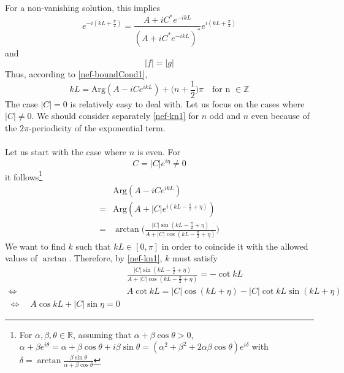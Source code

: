 For a non-vanishing solution, this implies
\begin{equation}\label{nef-boundCond1}
e^{-i(kL + \frac{\pi}{2})} = \frac{A + iC^* e^{-ikL}}{(A + iC^* e^{-ikL})^*} e^{i(kL + \frac{\pi}{2})}
\end{equation}
and 
\begin{equation}\label{nef-boundCond2}
| f | = | g |
\end{equation}
Thus, according to \cref{nef-boundCond1},
\begin{equation}\label{nef-kn1}
kL =  \textrm{Arg}(A - iC e^{ikL}) + \big(n+\frac{1}{2} \big)\pi   \quad \textrm{for n $\in \mathbb{Z}$}
\end{equation}
The case $|C| =0$ is relatively easy to deal with. Let us focus on the cases where $|C| \neq 0$. We should consider separately \cref{nef-kn1} for $n$ odd and $n$ even because of the $2\pi$-periodicity of the exponential term. \\\\
Let us start with the case where $n$ is even. 
For 
\begin{equation*}
C = |C| e^{i\eta} \neq 0 
\end{equation*}
it follows\footnote{
For $\alpha, \beta, \theta \in \mathbb{R}$, assuming that $\alpha + \beta \cos \theta > 0$, $\alpha + \beta e^{i \theta} = \alpha + \beta \cos \theta + i\beta \sin \theta = (\alpha^2 + \beta^2 + 2\alpha \beta \cos \theta) e^{i \delta}$ with $\delta = \arctan \frac{\beta\sin\theta}{\alpha + \beta\cos\theta}$  
} 
\begin{equation}
\begin{split}
&\textrm{Arg}(A - iC e^{ikL}) \\
= &\textrm{Arg}(A + |C| e^{i(kL - \frac{\pi}{2} + \eta)}) \\
= & \arctan \bigg( \frac{|C| \sin(kL - \frac{\pi}{2} + \eta)}{A + | C| \cos(kL - \frac{\pi}{2} + \eta) }\bigg)
\end{split}
\end{equation}
We want to find $k$ such that $kL \in [0, \pi]$ in order to coincide it with the allowed values of $\arctan$.
Therefore, by \cref{nef-kn1}, $k$ must satisfy
\begin{equation}\label{nef-arctan}
\begin{split}
& \frac{|C| \sin(kL - \frac{\pi}{2} + \eta)}{A + | C| \cos(kL - \frac{\pi}{2} + \eta) } =  - \cot kL  \\
\Leftrightarrow \quad & A \cot kL = |C| \cos(kL + \eta) - |C| \cot kL \sin(kL + \eta)  \\
%
\Leftrightarrow\quad
A \cos kL + |C| \sin\eta= 0
\end{split}
\end{equation}
